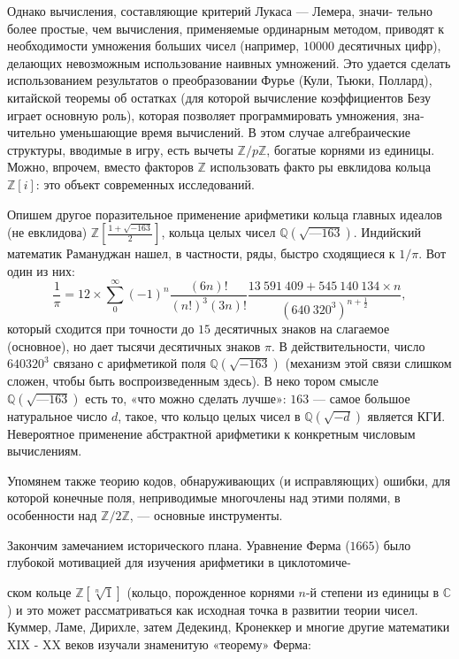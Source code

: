 \documentclass{mai_book}
\begin{document}
Однако вычисления, составляющие критерий Лукаса — Лемера, зна­чи-
тельно более простые, чем вычисления, применяемые ординарным
методом, приводят к необходимости умножения больших чисел (напри­мер, $10000$ десятичных цифр), делающих невозможным использование
наивных умножений. Это удается сделать использованием результатов
о преобразовании Фурье (Кули, Тьюки, Поллард), китайской теоре­мы об остатках (для которой вычисление коэффициентов Безу играет
основную роль), которая позволяет программировать умножения, зна­
чительно уменьшающие время вычислений. В этом случае алгебраиче­ские структуры, вводимые в игру, есть вычеты $\mathbb{Z}/p\mathbb{Z}$, богатые корнями
из единицы. Можно, впрочем, вместо факторов $\mathbb{Z}$ использовать факто­
ры евклидова кольца $\mathbb{Z}[i]$: это объект современных исследований.

Опишем другое поразительное применение арифметики кольца
главных идеалов (не евклидова) $\mathbb{Z}[\frac{1+\sqrt{-163}}{2}]$, кольца целых чисел
$\mathbb{Q}(\sqrt{—163})$. Индийский математик Рамануджан нашел, в частности, ря­ды, быстро сходящиеся к $1/\pi$. Вот один из них:
\[
\frac{1}{\pi}=12\times\sum_0^\infty(-1)^n\frac{(6n)!}{(n!)^3(3n)!}\frac{13~591~409 + 545~140~134 \times n}{(640~320^3)^{n+\frac{1}{2}}},
\]
который сходится при точности до $15$ десятичных знаков на слагаемое
(основное), но дает тысячи десятичных знаков $\pi$. В действительности,
число $640320^3$ связано с арифметикой поля $\mathbb{Q}(\sqrt{-163})$ (механизм этой
связи слишком сложен, чтобы быть воспроизведенным здесь). В неко­
тором смысле $\mathbb{Q}(\sqrt{—163})$ есть то, «что можно сделать лучше»: $163$ — самое большое натуральное число $d$, такое, что кольцо целых чисел в $\mathbb{Q}(\sqrt{-d})$ является КГИ. Невероятное применение абстрактной арифметики к конкретным числовым вычислениям.

Упомянем также теорию кодов, обнаруживающих (и исправляющих)
ошибки, для которой конечные поля, неприводимые многочлены над
этими полями, в особенности над $\mathbb{Z}/2\mathbb{Z}$, — основные инструменты.

Закончим замечанием исторического плана. Уравнение Ферма ($1665$)
было глубокой мотивацией для изучения арифметики в циклотомиче-

\noindent ском кольце $\mathbb{Z}[\sqrt[n]1]$ (кольцо, порожденное корнями $n$-й степени из единицы в $\mathbb{C}$) и это может рассматриваться как исходная точка в развитии теории чисел. Куммер, Ламе, Дирихле, затем Дедекинд, Кронеккер и многие другие математики XIX - XX веков изучали знаменитую «теорему» Ферма:
\\
\end{document}
